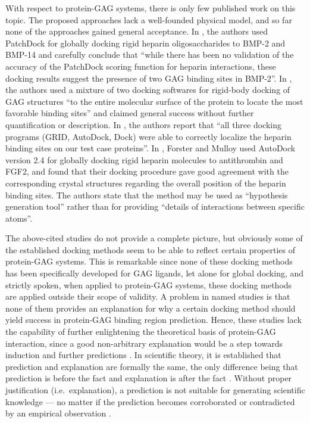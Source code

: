 With respect to protein-GAG systems, there is only few published work on this
topic. The proposed approaches lack a well-founded physical model, and so far
none of the approaches gained general acceptance. In
\cite{gandhi_bmp_heparin_binding_sites_2012}, the authors used PatchDock
\cite{patchdock_2002} for globally docking rigid heparin oligosaccharides to
BMP-2 and BMP-14 and carefully conclude that \enquote{while there has been no
validation of the accuracy of the PatchDock scoring function for heparin
interactions, these docking results suggest the presence of two GAG binding
sites in BMP-2}. In \cite{rogers_gag_prot_prot_2011}, the authors used a mixture
of two docking softwares for rigid-body docking of GAG structures \enquote{to
the entire molecular surface of the protein to locate the most favorable binding
sites} and claimed general success without further quantification or
description. In \cite{bitomsky_gag_docking_1999}, the authors report that
\enquote{all three docking programs (GRID, AutoDock, Dock) were able to
correctly localize the heparin binding sites on our test case proteins}. In
\cite{hp_binding_sites_mulloy_2006}, Forster and Mulloy used AutoDock version
2.4 \cite{autodock24} for globally docking rigid heparin molecules to
antithrombin and FGF2, and found that their docking procedure gave good
agreement with the corresponding crystal structures regarding the overall
position of the heparin binding sites. The authors state that the method may be
used as \enquote{hypothesis generation tool} rather than for providing
\enquote{details of interactions between specific atoms}.

The above-cited studies do not provide a complete picture, but obviously some of
the established docking methods seem to be able to reflect certain properties of
protein-GAG systems. This is remarkable since none of these docking methods has
been specifically developed for GAG ligands, let alone for global docking, and
strictly spoken, when applied to protein-GAG systems, these docking methods are
applied outside their scope of validity. A problem in named studies is that none
of them provides an explanation for why a certain docking method should yield
success in protein-GAG binding region prediction. Hence, these studies lack the
capability of further enlightening the theoretical basis of protein-GAG
interaction, since a good non-arbitrary explanation would be a step towards
induction and further predictions \cite{swirski2007literature}. In scientific
theory, it is established that prediction and explanation are formally the same,
the only difference being that prediction is before the fact and explanation is
after the fact \cite{suppe1977structure}. Without proper justification (i.e.\
explanation), a prediction is not suitable for generating scientific knowledge
--- no matter if the prediction becomes corroborated or contradicted by an
empirical observation \cite{schafersman_scientific_method}.

